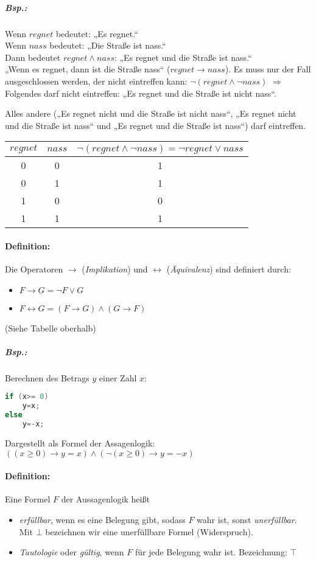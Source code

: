 \subparagraph{Bsp.:} Wenn $regnet$ bedeutet: „Es regnet.“\\
Wenn $nass$ bedeutet: „Die Straße ist nass.“\\
Dann bedeutet $regnet \wedge nass$: „Es regnet und die Straße ist nass.“\\
„Wenn es regnet, dann ist die Straße nass“ ($regnet \rightarrow nass$). Es muss nur der Fall ausgeschlossen werden, der nicht eintreffen kann: $\neg (regnet \wedge \neg nass)$ $\Rightarrow$ Folgendes darf nicht eintreffen: „Es regnet und die Straße ist nicht nass“. 

Alles andere („Es regnet nicht und die Straße ist nicht nass“, „Es regnet nicht und die Straße ist nass“ und „Es regnet und die Straße ist nass“) darf eintreffen.\\
\begin{tabular}{c c | c}
$regnet$ & $nass$ & $\neg (regnet \wedge \neg nass) = \neg regnet \vee nass$\\
\hline
0&0&1\\
0&1&1\\
1&0&0\\
1&1&1\\
\end{tabular}

\paragraph{Definition:} Die Operatoren $\rightarrow$ (\emph{Implikation}) und $\leftrightarrow$ (\emph{Äquivalenz}) sind definiert durch:
\begin{itemize}
\item $F\rightarrow G = \neg F \vee G$
\item $F\leftrightarrow G = (F \rightarrow G) \wedge (G \rightarrow F)$
\end{itemize}
(Siehe Tabelle oberhalb)

\subparagraph{Bsp.:} Berechnen des Betrags $y$ einer Zahl $x$:
\begin{lstlisting}[language=C]
if (x>= 0)
	y=x;
else 
	y=-x;
\end{lstlisting}
Dargestellt als Formel der Assagenlogik: $((x\geq 0) \rightarrow y=x)\wedge(\neg (x\geq 0) \rightarrow y=-x)$

\paragraph{Definition:} Eine Formel $F$ der Aussagenlogik heißt
\begin{itemize}

\item \emph{erfüllbar}, wenn es eine Belegung gibt, sodass $F$ wahr ist, sonst \emph{unerfüllbar}. Mit $\bot$ bezeichnen wir eine unerfüllbare Formel (Widerspruch).
\item \emph{Tautologie} oder \emph{gültig}, wenn $F$ für jede Belegung wahr ist. Bezeichnung: $\top$
\end{itemize}

